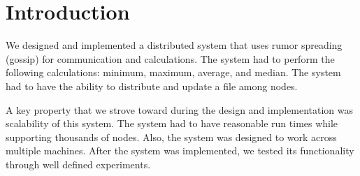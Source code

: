 \section{Introduction}
We designed and implemented a distributed system that uses rumor spreading (gossip) for communication and calculations. The system had to perform the following calculations: minimum, maximum, average, and median. The system had to have the ability to distribute and update a file among nodes. 

A key property that we strove toward during the design and implementation was scalability of this system. The system had to have reasonable run times while supporting thousands of nodes. Also, the system was designed to work across multiple machines. After the system was implemented, we tested its functionality through well defined experiments. 
